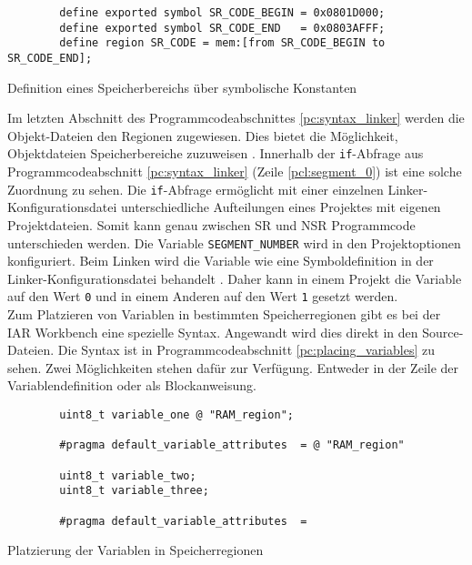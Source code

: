 \begin{listing}[H]
	\begin{verbatim}
		define exported symbol SR_CODE_BEGIN = 0x0801D000;
		define exported symbol SR_CODE_END   = 0x0803AFFF;
		define region SR_CODE = mem:[from SR_CODE_BEGIN to SR_CODE_END];
	\end{verbatim}
	\caption{Definition eines Speicherbereichs über symbolische Konstanten}
	\label{pc:definition_speicherbereich}
\end{listing}

Im letzten Abschnitt des Programmcodeabschnittes \ref{pc:syntax_linker} werden die Objekt-Dateien den Regionen zugewiesen.
Dies bietet die Möglichkeit, Objektdateien Speicherbereiche zuzuweisen \cite{inet:iar_placing}.
Innerhalb der \verb*|if|-Abfrage aus Programmcodeabschnitt \ref{pc:syntax_linker} (Zeile \ref{pcl:segment_0}) ist eine solche Zuordnung zu sehen.
Die \verb*|if|-Abfrage ermöglicht mit einer einzelnen Linker-Konfigurationsdatei unterschiedliche Aufteilungen eines Projektes mit eigenen Projektdateien.
Somit kann genau zwischen \ac{SR} und \ac{NSR} Programmcode unterschieden werden.
Die Variable \verb*|SEGMENT_NUMBER| wird in den Projektoptionen konfiguriert.
Beim Linken wird die Variable wie eine Symboldefinition in der Linker-Konfigurationsdatei behandelt \cite{booklet:iar_project}.
Daher kann in einem Projekt die Variable auf den Wert \verb*|0| und in einem Anderen auf den Wert \verb*|1| gesetzt werden. \\

Zum Platzieren von Variablen in bestimmten Speicherregionen gibt es bei der IAR Workbench eine spezielle Syntax.
Angewandt wird dies direkt in den Source-Dateien.
Die Syntax ist in Programmcodeabschnitt \ref{pc:placing_variables} zu sehen.
Zwei Möglichkeiten stehen dafür zur Verfügung.
Entweder in der Zeile der Variablendefinition oder als Blockanweisung.

\begin{listing}[H]
	\begin{verbatim}
		uint8_t variable_one @ "RAM_region";
		
		#pragma default_variable_attributes  = @ "RAM_region"
		
		uint8_t variable_two;
		uint8_t variable_three;
		
		#pragma default_variable_attributes  = 
	\end{verbatim}
	\caption{Platzierung der Variablen in Speicherregionen}
	\label{pc:placing_variables}
\end{listing}